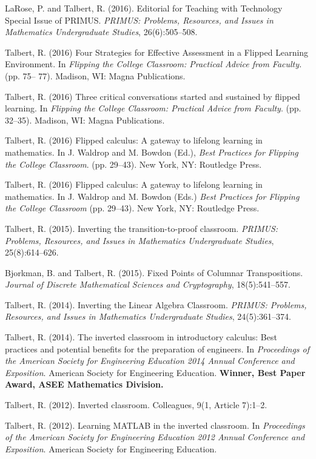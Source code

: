 \documentclass[letterpaper]{article}
\renewenvironment{itemize}{
  \begin{list}{}{
    \setlength{\leftmargin}{1.5em}
	\setlength{\itemsep}{0in}
  }
}{
  \end{list}
}
\begin{document}
\begin{itemize}
	\item LaRose, P. and Talbert, R. (2016). Editorial for Teaching with Technology Special Issue of PRIMUS. \textit{PRIMUS: Problems, Resources, and Issues in Mathematics Undergraduate Studies}, 26(6):505--508.
  \item Talbert, R. (2016) Four Strategies for Effective Assessment in a Flipped Learning Environment. In \textit{Flipping the College Classroom: Practical Advice from Faculty.} (pp. 75-- 77). Madison, WI: Magna Publications.
  \item Talbert, R. (2016) Three critical conversations started and sustained by flipped learning. In \textit{Flipping the College Classroom: Practical Advice from Faculty}. (pp. 32--35). Madison, WI: Magna Publications.
  \item Talbert, R. (2016) Flipped calculus: A gateway to lifelong learning in mathematics. In J. Waldrop and M. Bowdon (Ed.), \textit{Best Practices for Flipping the College Classroom}. (pp. 29--43). New York, NY: Routledge Press.
	\item Talbert, R. (2016) Flipped calculus: A gateway to lifelong learning in mathematics. In J. Waldrop and M. Bowdon (Eds.) \textit{Best Practices for Flipping the College Classroom} (pp. 29--43). New York, NY: Routledge Press.
	\item Talbert, R. (2015). Inverting the transition-to-proof classroom. \textit{PRIMUS: Problems, Resources, and Issues in Mathematics Undergraduate Studies}, 25(8):614--626.
	\item Bjorkman, B. and Talbert, R. (2015). Fixed Points of Columnar Transpositions. \textit{Journal of Discrete Mathematical Sciences and Cryptography}, 18(5):541--557.
	\item Talbert, R. (2014). Inverting the Linear Algebra Classroom. \textit{PRIMUS: Problems, Resources, and Issues in Mathematics Undergraduate Studies}, 24(5):361--374.
	\item Talbert, R. (2014). The inverted classroom in introductory calculus: Best practices and potential benefits for the preparation of engineers. In \textit{Proceedings of the American Society for Engineering Education 2014 Annual Conference and Exposition}. American Society for Engineering Education. \textbf{Winner, Best Paper Award, ASEE Mathematics Division.}
	\item Talbert, R. (2012). Inverted classroom. Colleagues, 9(1, Article 7):1--2.
	\item Talbert, R. (2012). Learning MATLAB in the inverted classroom. In \textit{Proceedings of the American Society for Engineering Education 2012 Annual Conference and Exposition}. American Society for Engineering Education.

\end{itemize}
\end{document}
